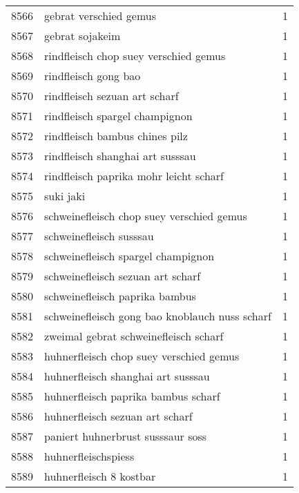 \begin{tabular}{llr}
8566 &                             gebrat verschied gemus &      1 \\
8567 &                                    gebrat sojakeim &      1 \\
8568 &              rindfleisch chop suey verschied gemus &      1 \\
8569 &                               rindfleisch gong bao &      1 \\
8570 &                      rindfleisch sezuan art scharf &      1 \\
8571 &                     rindfleisch spargel champignon &      1 \\
8572 &                     rindfleisch bambus chines pilz &      1 \\
8573 &                   rindfleisch shanghai art susssau &      1 \\
8574 &             rindfleisch paprika mohr leicht scharf &      1 \\
8575 &                                          suki jaki &      1 \\
8576 &          schweinefleisch chop suey verschied gemus &      1 \\
8577 &                            schweinefleisch susssau &      1 \\
8578 &                 schweinefleisch spargel champignon &      1 \\
8579 &                  schweinefleisch sezuan art scharf &      1 \\
8580 &                     schweinefleisch paprika bambus &      1 \\
8581 &     schweinefleisch gong bao knoblauch nuss scharf &      1 \\
8582 &              zweimal gebrat schweinefleisch scharf &      1 \\
8583 &            huhnerfleisch chop suey verschied gemus &      1 \\
8584 &                 huhnerfleisch shanghai art susssau &      1 \\
8585 &                huhnerfleisch paprika bambus scharf &      1 \\
8586 &                    huhnerfleisch sezuan art scharf &      1 \\
8587 &                  paniert huhnerbrust susssaur soss &      1 \\
8588 &                                huhnerfleischspiess &      1 \\
8589 &                            huhnerfleisch 8 kostbar &      1 \\

\end{tabular}
